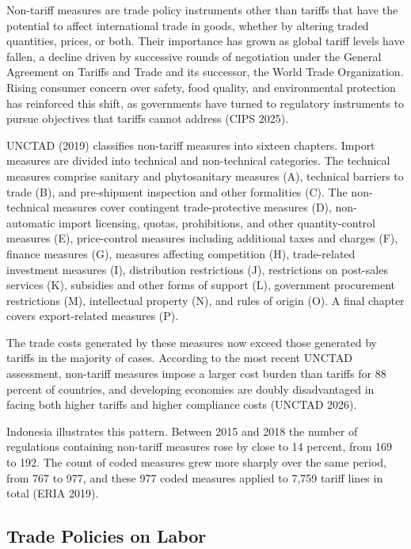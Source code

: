 \documentclass[
  manuscript=article,
  layout=publish,
  year=2026,
  volume=1,
]{den}
\begin{document}
Non-tariff measures are trade policy instruments other than tariffs that
have the potential to affect international trade in goods, whether by
altering traded quantities, prices, or both. Their importance has grown
as global tariff levels have fallen, a decline driven by successive
rounds of negotiation under the General Agreement on Tariffs and Trade
and its successor, the World Trade Organization. Rising consumer concern
over safety, food quality, and environmental protection has reinforced
this shift, as governments have turned to regulatory instruments to
pursue objectives that tariffs cannot address (CIPS 2025).

UNCTAD (2019) classifies non-tariff measures into sixteen chapters.
Import measures are divided into technical and non-technical categories.
The technical measures comprise sanitary and phytosanitary measures (A),
technical barriers to trade (B), and pre-shipment inspection and other
formalities (C). The non-technical measures cover contingent
trade-protective measures (D), non-automatic import licensing, quotas,
prohibitions, and other quantity-control measures (E), price-control
measures including additional taxes and charges (F), finance measures
(G), measures affecting competition (H), trade-related investment
measures (I), distribution restrictions (J), restrictions on post-sales
services (K), subsidies and other forms of support (L), government
procurement restrictions (M), intellectual property (N), and rules of
origin (O). A final chapter covers export-related measures (P).

The trade costs generated by these measures now exceed those generated
by tariffs in the majority of cases. According to the most recent UNCTAD
assessment, non-tariff measures impose a larger cost burden than tariffs
for 88 percent of countries, and developing economies are doubly
disadvantaged in facing both higher tariffs and higher compliance costs
(UNCTAD 2026).

Indonesia illustrates this pattern. Between 2015 and 2018 the number of
regulations containing non-tariff measures rose by close to 14 percent,
from 169 to 192. The count of coded measures grew more sharply over the
same period, from 767 to 977, and these 977 coded measures applied to
7,759 tariff lines in total (ERIA 2019).

\subsection{Trade Policies on Labor}\label{trade-policies-on-labor}
\end{document}
